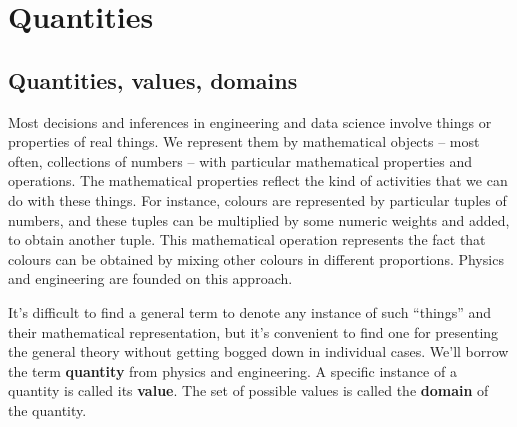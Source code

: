 \documentclass[
  a4paper,
  DIV=11,
  numbers=noendperiod,
  oneside]{scrreprt}
\begin{document}
\providecommand{\se}[1]{\mathsfit{#1}}
\renewcommand{\se}[1]{\mathsfit{#1}}
\providecommand{\p}{\mathrm{p}}
\renewcommand{\p}{\mathrm{p}}
\renewcommand{\P}{\mathrm{P}}

\providecommand*{\mo}[1][=]{\mathord{\,#1\,}}
\providecommand*{\yX}{\se{X}}
\providecommand*{\yY}{\se{Y}}
\providecommand*{\yI}{\se{I}}
\providecommand*{\yi}[1][]{\se{I}_{\text{#1}}}
\providecommand{\di}{\mathrm{d}}

\hypertarget{quantities}{%
\section{Quantities}\label{quantities}}

\hypertarget{sec-quant-value-dom}{%
\subsection{Quantities, values, domains}\label{sec-quant-value-dom}}

Most decisions and inferences in engineering and data science involve
things or properties of real things. We represent them by mathematical
objects -- most often, collections of numbers -- with particular
mathematical properties and operations. The mathematical properties
reflect the kind of activities that we can do with these things. For
instance, colours are represented by particular tuples of numbers, and
these tuples can be multiplied by some numeric weights and added, to
obtain another tuple. This mathematical operation represents the fact
that colours can be obtained by mixing other colours in different
proportions. Physics and engineering are founded on this approach.

It's difficult to find a general term to denote any instance of such
``things'' and their mathematical representation, but it's convenient to
find one for presenting the general theory without getting bogged down
in individual cases. We'll borrow the term {\textbf{quantity}} from
physics and engineering. A specific instance of a quantity is called its
{\textbf{value}}. The set of possible values is called the
{\textbf{domain}} of the quantity.
\end{document}
